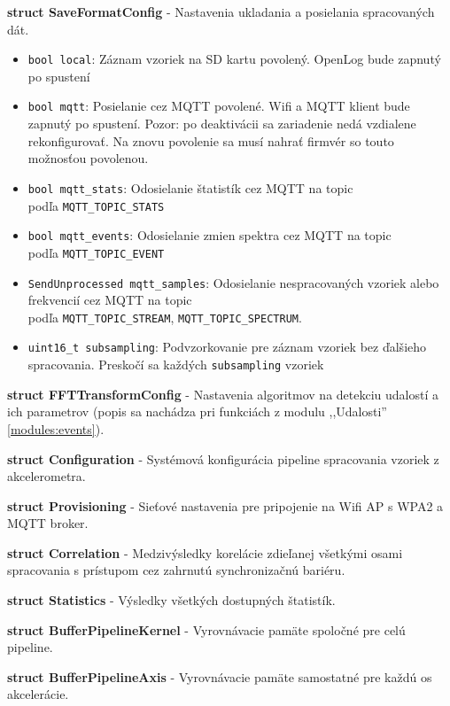 \noindent\textbf{struct SaveFormatConfig} - Nastavenia ukladania a posielania spracovaných dát.
\begin{itemize}[noitemsep, topsep=0pt]
	\item \verb|bool local|: Záznam vzoriek na SD kartu povolený. OpenLog bude zapnutý po spustení
	\item \verb|bool mqtt|: Posielanie cez MQTT povolené. Wifi a MQTT klient bude zapnutý po spustení. Pozor: po deaktivácii
	sa zariadenie nedá vzdialene rekonfigurovať. Na znovu povolenie sa musí nahrať firmvér so touto možnosťou povolenou. 
	\item \verb|bool mqtt_stats|: Odosielanie štatistík cez MQTT na topic \\ podľa \verb|MQTT_TOPIC_STATS|
	\item \verb|bool mqtt_events|:  Odosielanie zmien spektra cez MQTT na topic \\ podľa \verb|MQTT_TOPIC_EVENT|
	\item \verb|SendUnprocessed mqtt_samples|:  Odosielanie nespracovaných vzoriek alebo frekvencií cez MQTT na topic \\ podľa \verb|MQTT_TOPIC_STREAM|, \verb|MQTT_TOPIC_SPECTRUM|.
	\item \verb|uint16_t subsampling|: Podvzorkovanie pre záznam vzoriek bez ďalšieho spracovania. Preskočí sa každých \verb|subsampling| vzoriek
\end{itemize}
\bigbreak

\noindent\textbf{struct FFTTransformConfig} - Nastavenia algoritmov na detekciu udalostí a ich parametrov (popis sa nachádza pri 
funkciách z modulu ,,Udalosti'' \ref{modules:events}).
\bigbreak

\noindent\textbf{struct Configuration} - Systémová konfigurácia pipeline spracovania vzoriek z akcelerometra.
\bigbreak

\noindent\textbf{struct Provisioning} - Sieťové nastavenia pre pripojenie na Wifi AP s WPA2 a MQTT broker.
\bigbreak

\noindent\textbf{struct Correlation} - Medzivýsledky korelácie zdieľanej všetkými osami spracovania s prístupom
cez zahrnutú synchronizačnú bariéru.
\bigbreak

\noindent\textbf{struct Statistics} - Výsledky všetkých dostupných štatistík.
\bigbreak

\noindent\textbf{struct BufferPipelineKernel} - Vyrovnávacie pamäte spoločné pre celú pipeline.
\bigbreak

\noindent\textbf{struct BufferPipelineAxis} - Vyrovnávacie pamäte samostatné pre každú os akcelerácie.
\bigbreak

